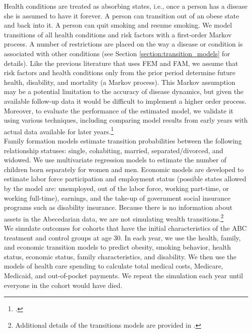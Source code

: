 \noindent Health conditions are treated as absorbing states, i.e., once a person has a disease she is assumed to have it forever. A person can transition out of an obese state and back into it.  A person can quit smoking and resume smoking. We model transitions of all health conditions and risk factors with a first-order Markov process. A number of restrictions are placed on the way a disease or condition is associated with other conditions (see Section \ref{section:transition_models} for details). Like the previous literature that uses FEM and FAM, we assume that risk factors and health conditions only from the prior period determine future health, disability, and mortality (a Markov process). This Markov assumption may be a potential limitation to the accuracy of disease dynamics, but given the available follow-up data it would be difficult to implement a higher order process. Moreover, to evaluate the performance of the estimated model, we validate it using various techniques, including comparing model results from early years with actual data available for later years.\footnote{\citet{Goldman_etal_2015_Future-America-Model}.} \\

\noindent Family formation models estimate transition probabilities between the following relationship statuses:  single, cohabiting, married, separated/divorced, and widowed. We use multivariate regression models to estimate the number of children born separately for women and men. Economic models are developed to estimate labor force participation and employment status (possible states allowed by the model are: unemployed, out of the labor force, working part-time, or working full-time), earnings, and the take-up of government social insurance programs such as disability insurance. Because there is no information about assets in the Abecedarian data, we are not simulating wealth transitions.\footnote{Additional details of the transitions models are provided in \citet{Goldman_etal_2015_Future-America-Model}.} \\

\noindent We simulate outcomes for cohorts that have the initial characteristics of the ABC treatment and control groups at age 30. In each year, we use the health, family, and economic transition models to predict obesity, smoking behavior, health status, economic status, family characteristics, and disability. We then use the models of health care spending to calculate total medical costs, Medicare, Medicaid, and out-of-pocket payments. We repeat the simulation each year until everyone in the cohort would have died. \\
